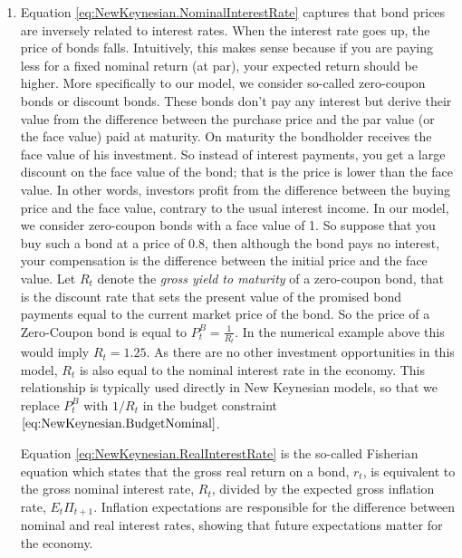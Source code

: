 \begin{enumerate}
\item Equation \eqref{eq:NewKeynesian.NominalInterestRate} captures that bond prices are inversely related to interest rates.
When the interest rate goes up, the price of bonds falls.
Intuitively, this makes sense because if you are paying less for a fixed nominal return (at par),
  your expected return should be higher.
More specifically to our model, we consider so-called zero-coupon bonds or discount bonds.
These bonds don't pay any interest but derive their value from the difference between the purchase price
  and the par value (or the face value) paid at maturity.
On maturity the bondholder receives the face value of his investment.
So instead of interest payments, you get a large discount on the face value of the bond;
  that is the price is lower than the face value.
In other words, investors profit from the difference between the buying price and the face value, contrary to the usual interest income.
In our model, we consider zero-coupon bonds with a face value of 1.
So suppose that you buy such a bond at a price of 0.8, then although the bond pays no interest,
  your compensation is the difference between the initial price and the face value.
Let $R_t$ denote the \emph{gross yield to maturity} of a zero-coupon bond,
  that is the discount rate that sets the present value of the promised bond payments equal to the current market price of the bond.
So the price of a Zero-Coupon bond is equal to $P^B_t = \frac{1}{R_t}$.
In the numerical example above this would imply $R_t=1.25$.
As there are no other investment opportunities in this model,
  $R_t$ is also equal to the nominal interest rate in the economy.
This relationship is typically used directly in New Keynesian models,
  so that we replace $P^B_t$ with $1/R_t$ in the budget constraint $\eqref{eq:NewKeynesian.BudgetNominal}$.
	
Equation \eqref{eq:NewKeynesian.RealInterestRate} is the so-called Fisherian equation
  which states that the gross real return on a bond, $r_t$,
  is equivalent to the gross nominal interest rate, $R_t$, divided by the expected gross inflation rate, $E_t \Pi_{t+1}$.
Inflation expectations are responsible for the difference between nominal and real interest rates,
  showing that future expectations matter for the economy.


\end{enumerate}
